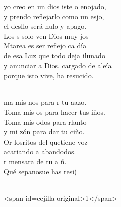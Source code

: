 \documentclass[12pt]{article}
\begin{document}
\begin{multicols*}{2}
\begin{cancion}%
	 yo creo en un dios iste o enojado,\\
	y prendo reflejarlo como un esjo,\\
	el desllo será nulo y apago.\\
	Los s solo ven Dios muy jos  \\
	Mtarea es ser reflejo ca día\\
	de esa Luz que todo deja ilunado\\
	y anunciar a Dios, cargado de aleía\\
	porque isto vive, ha resucido.\\\jump\\
	\begin{chorus}%
	ma mis nos para r tu aazo.\\
	Toma mis os para hacer tus iños.\\
	Toma mis odos para rlanto\\
	y mi zón para dar tu ciño.\\
	Or losritos del quetiene voz\\
	acariando a abandodos.\\
	r mensara de tu a ñ. \\
	Qué sepanosue has resi(\\
	\end{chorus}%
	\jump\\
<span id=cejilla-original>1</span>\\
\end{cancion}%


\end{multicols*}
\end{document}
